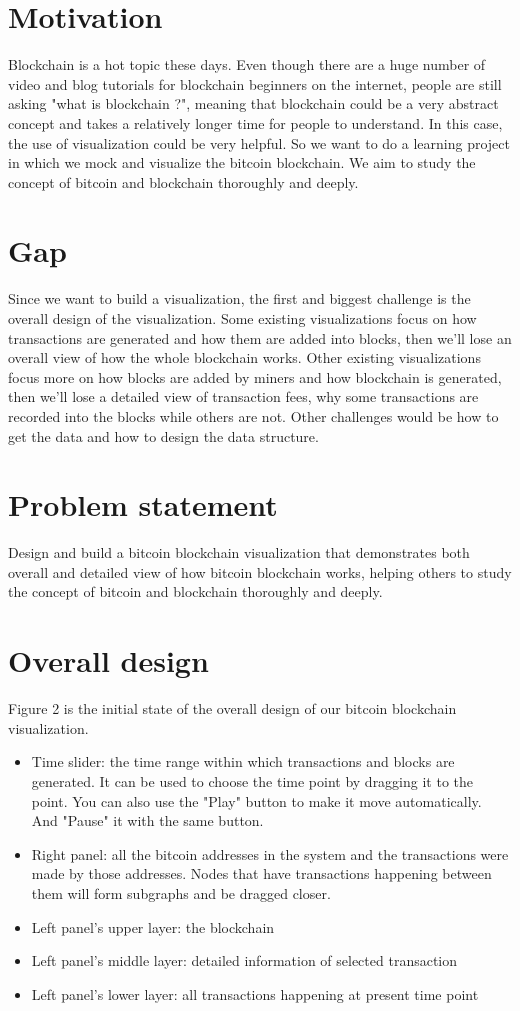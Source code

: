 \documentclass[journal, a4paper]{IEEEtran}
\begin{document}
\section{Motivation}
Blockchain is a hot topic these days. Even though there are a huge number of video and blog tutorials for blockchain beginners on the internet, people are still asking "what is blockchain ?", meaning that blockchain could be a very abstract concept and takes a relatively longer time for people to understand. In this case, the use of visualization could be very helpful. So we want to do a learning project in which we mock and visualize the bitcoin blockchain. We aim to study the concept of bitcoin and blockchain thoroughly and deeply.

\section{Gap}
Since we want to build a visualization, the first and biggest challenge is the overall design of the visualization. Some existing visualizations focus on how transactions are generated and how them are added into blocks, then we'll lose an overall view of how the whole blockchain works. Other existing visualizations focus more on how blocks are added by miners and how blockchain is generated, then we'll lose a detailed view of transaction fees, why some transactions are recorded into the blocks while others are not. Other challenges would be how to get the data and how to design the data structure.

\section{Problem statement}
Design and build a bitcoin blockchain visualization that demonstrates both overall and detailed view of how bitcoin blockchain works, helping others to study the concept of bitcoin and blockchain thoroughly and deeply.

\section{Overall design}
Figure 2 is the initial state of the overall design of our bitcoin blockchain visualization.
\begin{itemize}
    \item Time slider: the time range within which transactions and blocks are generated. It can be used to choose the time point by dragging it to the point. You can also use the "Play" button to make it move automatically. And "Pause" it with the same button.
    \item Right panel: all the bitcoin addresses in the system and the transactions were made by those addresses. Nodes that have transactions happening between them will form subgraphs and be dragged closer.
    \item Left panel's upper layer: the blockchain
    \item Left panel's middle layer: detailed information of selected transaction
    \item Left panel's lower layer: all transactions happening at present time point
\end{itemize}
\end{document}
